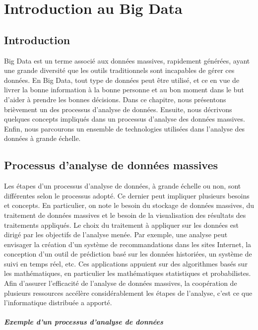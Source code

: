 \chapter{Introduction au Big Data} \label{chap:big-data-intro}
	\section{Introduction}
		Big Data est un terme associé aux données massives, rapidement générées, ayant une grande diversité que les  outils traditionnels sont incapables de gérer ces données. En Big Data,  tout type de données peut être utilisé, et ce en vue de livrer la bonne information à la bonne personne et au bon moment dans le but d'aider à prendre les bonnes décisions. Dans ce chapitre, nous  présentons brièvement un des processus d'analyse de données. Ensuite, nous décrivons quelques concepts impliqués dans un processus d'analyse des données massives. Enfin, nous parcourons un ensemble de technologies utilisées dans l'analyse des données à grande échelle.
			
	\section{Processus d'analyse de données massives}
Les étapes d'un processus d'analyse de données, à grande échelle ou non, sont différentes selon le processus adopté.  Ce dernier peut impliquer plusieurs besoins et concepts. En particulier, on note le besoin du stockage de données massives, du traitement de données massives et le besoin de la visualisation des résultats des traitements appliqués. Le choix du traitement à appliquer sur les données est dirigé par les objectifs de  l'analyse menée. Par exemple, une analyse peut envisager la création d'un système de recommandations dans les sites Internet, la conception d'un outil de prédiction basé sur les données historiées, un système de suivi en temps réel, etc.  Ces applications appuient sur des algorithmes basés sur les mathématiques, en particulier les mathématiques statistiques et probabilistes. Afin d'assurer l'efficacité de l'analyse de données massives, la coopération de plusieurs ressources accélère considérablement les étapes de l'analyse, c'est ce que l'informatique distribuée a apporté.
\paragraph{Exemple d'un  processus d'analyse de données} \label{sec:process-data-analysis}~

